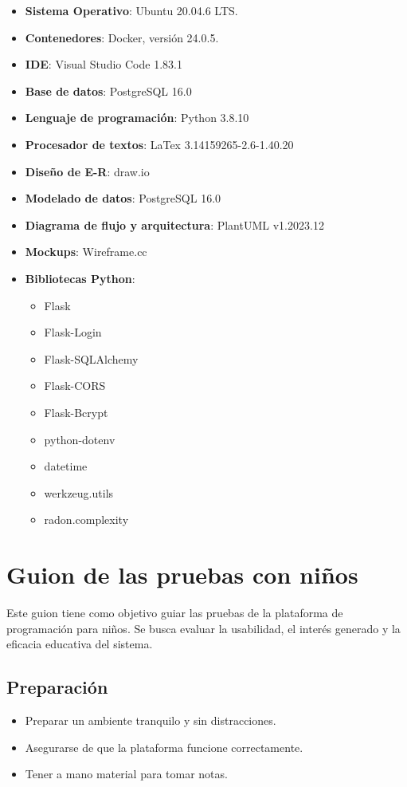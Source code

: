 \begin{appendices}
\begin{itemize}
    \item \textbf{Sistema Operativo}: Ubuntu 20.04.6 LTS.
    \item \textbf{Contenedores}: Docker, versión 24.0.5.
    \item \textbf{IDE}: Visual Studio Code 1.83.1
    \item \textbf{Base de datos}: PostgreSQL 16.0
    \item \textbf{Lenguaje de programación}: Python 3.8.10
    \item \textbf{Procesador de textos}: LaTex 3.14159265-2.6-1.40.20
    \item \textbf{Diseño de E-R}: draw.io
    \item \textbf{Modelado de datos}: PostgreSQL 16.0
    \item \textbf{Diagrama de flujo y arquitectura}: PlantUML v1.2023.12
    \item \textbf{Mockups}: Wireframe.cc
    \item \textbf{Bibliotecas Python}:
    \begin{itemize}
        \item Flask \cite{flask}
        \item Flask-Login \cite{flask-login}
        \item Flask-SQLAlchemy \cite{flask-sqlalchemy}
        \item Flask-CORS \cite{flask-cors}
        \item Flask-Bcrypt \cite{flask-bcrypt}
        \item python-dotenv \cite{python-dotenv}
        \item datetime \cite{datetime}
        \item werkzeug.utils \cite{werkzeug}
        \item radon.complexity \cite{radon}
    \end{itemize}
\end{itemize}
    
\chapter{Guion de las pruebas con niños}

Este guion tiene como objetivo guiar las pruebas de la plataforma de programación para niños. Se busca evaluar la usabilidad, el interés generado y la eficacia educativa del sistema.

\section{Preparación}
\begin{itemize}
    \item Preparar un ambiente tranquilo y sin distracciones.
    \item Asegurarse de que la plataforma funcione correctamente.
    \item Tener a mano material para tomar notas.
\end{itemize}


\end{appendices}
